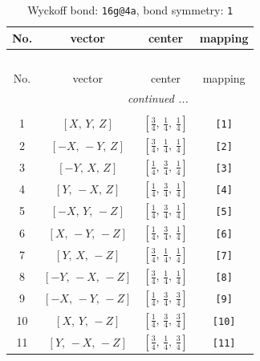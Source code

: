 \documentclass[fleqn,8pt]{jsarticle}
\begin{document}
\begin{longtable}{cccc}
\caption{Wyckoff bond: {\tt 16g@4a}, bond symmetry: {\tt 1}}
 \\
 \hline \hline
No. & vector & center & mapping \\ \hline \endfirsthead

\multicolumn{3}{l}{\tablename\ \thetable{}} \\
 \hline \hline
No. & vector & center & mapping \\ \hline \endhead

 \hline \hline
\multicolumn{3}{r}{\footnotesize\it continued ...} \\ \endfoot

 \hline \hline
\multicolumn{3}{r}{} \\ \endlastfoot

1 & $\left[ X,\, Y,\, Z \right]$ & $\left[ \frac{3}{4},\, \frac{1}{4},\, \frac{1}{4} \right]$ & {\tt [1]} \\ \hline
2 & $\left[ - X,\, - Y,\, Z \right]$ & $\left[ \frac{3}{4},\, \frac{1}{4},\, \frac{1}{4} \right]$ & {\tt [2]} \\ \hline
3 & $\left[ - Y,\, X,\, Z \right]$ & $\left[ \frac{1}{4},\, \frac{3}{4},\, \frac{1}{4} \right]$ & {\tt [3]} \\ \hline
4 & $\left[ Y,\, - X,\, Z \right]$ & $\left[ \frac{1}{4},\, \frac{3}{4},\, \frac{1}{4} \right]$ & {\tt [4]} \\ \hline
5 & $\left[ - X,\, Y,\, - Z \right]$ & $\left[ \frac{1}{4},\, \frac{3}{4},\, \frac{1}{4} \right]$ & {\tt [5]} \\ \hline
6 & $\left[ X,\, - Y,\, - Z \right]$ & $\left[ \frac{1}{4},\, \frac{3}{4},\, \frac{1}{4} \right]$ & {\tt [6]} \\ \hline
7 & $\left[ Y,\, X,\, - Z \right]$ & $\left[ \frac{3}{4},\, \frac{1}{4},\, \frac{1}{4} \right]$ & {\tt [7]} \\ \hline
8 & $\left[ - Y,\, - X,\, - Z \right]$ & $\left[ \frac{3}{4},\, \frac{1}{4},\, \frac{1}{4} \right]$ & {\tt [8]} \\ \hline
9 & $\left[ - X,\, - Y,\, - Z \right]$ & $\left[ \frac{1}{4},\, \frac{3}{4},\, \frac{3}{4} \right]$ & {\tt [9]} \\ \hline
10 & $\left[ X,\, Y,\, - Z \right]$ & $\left[ \frac{1}{4},\, \frac{3}{4},\, \frac{3}{4} \right]$ & {\tt [10]} \\ \hline
11 & $\left[ Y,\, - X,\, - Z \right]$ & $\left[ \frac{3}{4},\, \frac{1}{4},\, \frac{3}{4} \right]$ & {\tt [11]} \\ \hline

\end{longtable}
\end{document}
